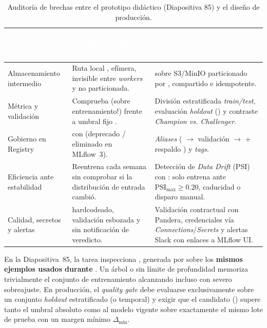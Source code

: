\begin{table}[htbp]
\centering
\caption{Auditoría de brechas entre el prototipo didáctico (Diapositiva 85) y el diseño de producción.}
\label{tab:auditoria-slide85}
\small
\begin{tabularx}{\textwidth}{@{}L{2.7cm} L{5.4cm} Y@{}}
\toprule
{}
\textcolor{white}{\sffamily\bfseries Aspecto} &
\textcolor{white}{\sffamily\bfseries Prototipo \texttt{retrain\_iris} (Slide 85)} &
\textcolor{white}{\sffamily\bfseries Solución de producción (Capítulo 10)} \\
\midrule
Almacenamiento intermedio &
Ruta local , efímera, invisible entre \textit{workers} y no particionada. &
 sobre S3/MinIO particionado por , compartido e idempotente. \\
Métrica y validación &
Comprueba  (sobre entrenamiento!) frente a umbral fijo . &
División estratificada \textit{train/test}, evaluación \textit{holdout} () y contraste \textit{Champion vs. Challenger}. \\
Gobierno en Registry &
 con  (deprecado / eliminado en MLflow~3). &
\textit{Aliases} ( $\rightarrow$ validación $\rightarrow$  + respaldo ) y \textit{tags}. \\
Eficiencia ante estabilidad &
Reentrena cada semana sin comprobar si la distribución de entrada cambió. &
Detección de \textit{Data Drift} (PSI) con : solo entrena ante $\mathrm{PSI}_{\max} \ge 0.20$, caducidad o disparo manual. \\
Calidad, secretos y alertas &
 hardcodeado, validación esbozada y sin notificación de veredicto. &
Validación contractual con Pandera, credenciales vía \textit{Connections}/\textit{Secrets} y alertas Slack con enlaces a MLflow UI. \\
\bottomrule
\end{tabularx}
\end{table}

\begin{warningbox}
En la Diapositiva~85, la tarea  inspecciona , generada por  sobre los \textbf{mismos ejemplos usados durante }. Un árbol o  sin límite de profundidad memoriza trivialmente el conjunto de entrenamiento alcanzando  incluso con severo sobreajuste. En producción, el \textit{quality gate} debe evaluarse exclusivamente sobre un conjunto \textit{holdout} estratificado (o temporal) y exigir que el candidato () supere tanto el umbral absoluto como al modelo  vigente sobre exactamente el mismo lote de prueba con un margen mínimo $\Delta_{\min}$.
\end{warningbox}

